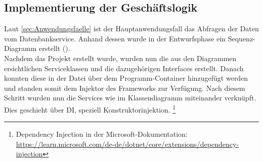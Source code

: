 \subsection{Implementierung der Geschäftslogik}
\label{sec:ImplementierungGeschaeftslogik}
Laut \ref{sec:Anwendungsfaelle}  ist der Hauptanwendungsfall
das Abfragen der Daten vom Datenbankservice. Anhand dessen wurde in der Entwurfsphase ein
Sequenz-Diagramm erstellt (\Vgl {}).\\
Nachdem das Projekt erstellt wurde, wurden nun die aus den Diagrammen ersichtlichen Serviceklassen
und die dazugehörigen Interfaces erstellt. Danach konnten diese in der Datei 
über  dem Programm-Container hinzugefügt werden und standen somit 
dem Injektor des Frameworks zur Verfügung. Nach diesem Schritt wurden nun die Services wie
im Klassendiagramm  miteinander verknüpft.
Dies geschieht über \acs{DI}, speziell Konstruktorinjektion. \footnote{Dependency Injection in der Microsoft-Dokumentation:\\ 
\url{https://learn.microsoft.com/de-de/dotnet/core/extensions/dependency-injection}}\\

